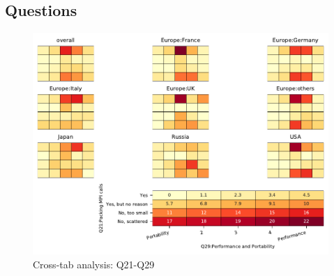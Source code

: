 
\subsection{Questions}


\begin{figure}
\begin{center}
\includegraphics[width=12cm]{../pdfs/Q21-Q29.pdf}
\caption{Cross-tab analysis: Q21-Q29}
\label{fig:Q21-Q29}
\end{center}
\end{figure}
